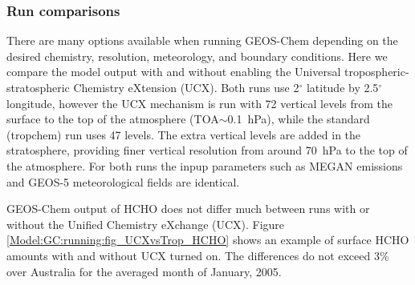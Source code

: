       
      
    \subsubsection{Run comparisons}
  
      There are many options available when running GEOS-Chem depending on the desired chemistry, resolution, meteorology, and boundary conditions.
      Here we compare the model output with and without enabling the Universal tropospheric-stratospheric Chemistry eXtension (UCX).
      Both runs use 2$^{\circ}$ latitude by 2.5$^{\circ}$ longitude, however the UCX mechanism is run with 72 vertical levels from the surface to the top of the atmosphere (TOA$\sim$0.1~hPa), while the standard (tropchem) run uses 47 levels.
      The extra vertical levels are added in the stratosphere, providing finer vertical resolution from around 70~hPa to the top of the atmosphere.
      For both runs the inpup parameters such as MEGAN emissions and GEOS-5 meteorological fields are identical.
      
      GEOS-Chem output of HCHO does not differ much between runs with or without the Unified Chemistry eXchange (UCX).
      Figure \ref{Model:GC:running:fig_UCXvsTrop_HCHO} shows an example of surface HCHO amounts with and without UCX turned on.
      The differences do not exceed 3\% over Australia for the averaged month of January, 2005.
      
